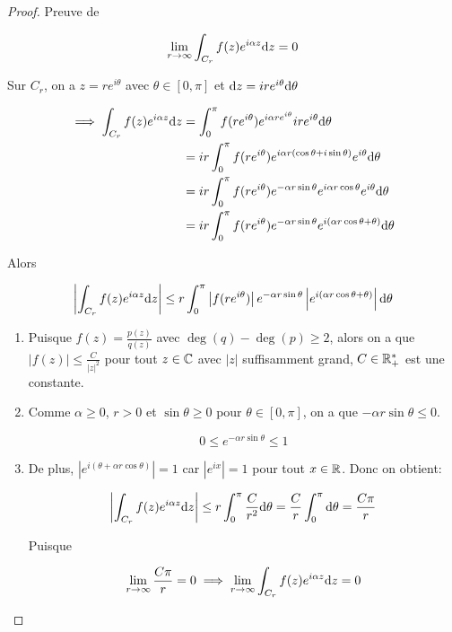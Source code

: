 \begin{proof}
    Preuve de
    
    \[ \lim_{r \rightarrow \infty} \int_{C_r} f(z) e^{i\alpha z} \mathrm{d}z = 0 \]
    
    Sur $C_r$, on a $z = r e^{i\theta}$ avec $\theta \in [0,\pi]$ et $\mathrm{d}z = i r e^{i\theta} \mathrm{d}\theta$
    
    \begin{align*}
        \implies \int_{C_r} f(z) e^{i\alpha z} \mathrm{d}z
        &= \int_0^\pi f(r e^{i\theta}) e^{i\alpha r e^{i\theta}} i r e^{i\theta} \mathrm{d}\theta
        \\&= ir \int_0^\pi f(r e^{i\theta}) e^{i\alpha r (\cos \theta + i \sin \theta)} e^{i\theta} \mathrm{d}\theta
        \\&= ir \int_0^\pi f(r e^{i\theta}) e^{-\alpha r\sin \theta}e^{i\alpha r \cos \theta} e^{i\theta} \mathrm{d}\theta
        \\&= ir \int_0^\pi f(r e^{i\theta}) e^{-\alpha r\sin \theta}e^{i \left(\alpha r \cos \theta + \theta\right)} \mathrm{d}\theta
    \end{align*}
    
    Alors
    
    \[
        \left| \int_{C_r} f(z) e^{i\alpha z} \mathrm{d}z \right|
        \leq r \int_0^\pi \left| f(r e^{i\theta}) \right| e^{-\alpha r\sin \theta} \left| e^{i \left(\alpha r \cos \theta + \theta\right)} \right| \mathrm{d}\theta
    \]
    
    \begin{enumerate}
        \item 
        Puisque $f(z) = \frac{p(z)}{q(z)}$ avec $\deg(q) - \deg(p) \geq 2$, alors on a que $\left|f(z)\right| \leq \frac{C}{|z|^2}$ pour tout $z \in \mathbb{C}$ avec $|z|$ suffisamment grand, $C \in \mathbb{R}^\ast_+$ est une constante.
        
        \item 
        Comme $\alpha \geq 0$, $r > 0$ et $\sin \theta \geq 0$ pour $\theta \in [0, \pi]$, on a que $-\alpha r \sin \theta \leq 0$.
        
        \[ 0 \leq e^{-\alpha r \sin \theta} \leq 1 \]
        
        \item 
        De plus, $\left| e^{i(\theta + \alpha r \cos \theta)} \right| = 1$ car $\left|e^{ix}\right| = 1$ pour tout $x \in \mathbb{R}$.
        Donc on obtient:
        
        \[
            \left| \int_{C_r} f(z) e^{i\alpha z} \mathrm{d}z \right|
            \leq r \int_0^\pi \frac{C}{r^2} \mathrm{d}\theta = \frac{C}{r} \int_0^\pi \mathrm{d}\theta = \frac{C\pi}{r}
        \]
        
        Puisque 
        
        \[
            \lim_{r \rightarrow \infty} \frac{C\pi}{r} = 0 \implies \lim_{r \rightarrow \infty} \int_{C_r} f(z) e^{i\alpha z} \mathrm{d}z = 0
        \]
    \end{enumerate}
\end{proof}

